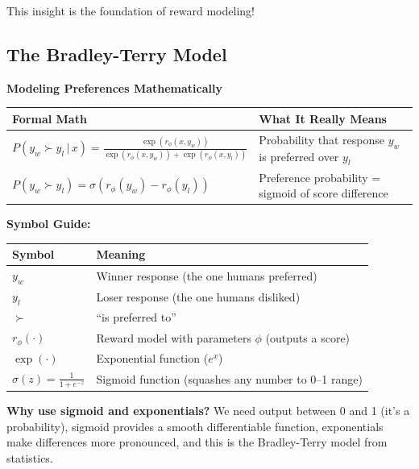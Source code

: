 \begin{chapterenv}
This insight is the foundation of reward modeling!

\subsection{The Bradley-Terry Model}

\begin{infobox}
\textbf{Modeling Preferences Mathematically}

\begin{center}
\begin{tabular}{p{}p{}}
\toprule
\textbf{Formal Math} & \textbf{What It Really Means} \\
\midrule
$P(y_w \succ y_l \,|\, x) = \frac{\exp(r_\phi(x, y_w))}{\exp(r_\phi(x, y_w)) + \exp(r_\phi(x, y_l))}$ & Probability that response $y_w$ is preferred over $y_l$ \\
\midrule
$P(y_w \succ y_l) = \sigma(r_\phi(y_w) - r_\phi(y_l))$ & Preference probability = sigmoid of score difference \\
\bottomrule
\end{tabular}
\end{center}

\textbf{Symbol Guide:}

\begin{center}
\begin{tabular}{p{}p{}}
\toprule
\textbf{Symbol} & \textbf{Meaning} \\
\midrule
$y_w$ & Winner response (the one humans preferred) \\
$y_l$ & Loser response (the one humans disliked) \\
$\succ$ & ``is preferred to'' \\
$r_\phi(\cdot)$ & Reward model with parameters $\phi$ (outputs a score) \\
$\exp(\cdot)$ & Exponential function ($e^x$) \\
$\sigma(z) = \frac{1}{1+e^{-z}}$ & Sigmoid function (squashes any number to 0--1 range) \\
\bottomrule
\end{tabular}
\end{center}

\textbf{Why use sigmoid and exponentials?} We need output between 0 and 1 (it's a probability), sigmoid provides a smooth differentiable function, exponentials make differences more pronounced, and this is the Bradley-Terry model from statistics.
\end{infobox}


\end{chapterenv}

